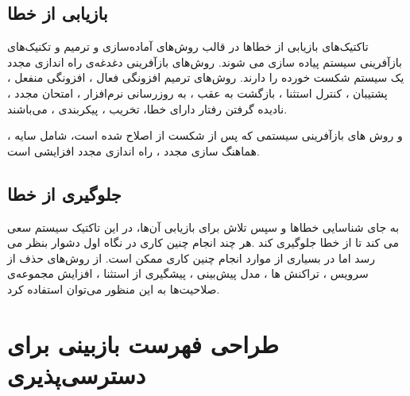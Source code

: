 \subsection{بازیابی از خطا}
تاکتیک‌های بازیابی از خطاها در قالب روش‌های آماده‌سازی و ترمیم و تکنیک‌های بازآفرینی سیستم پیاده سازی می شوند. روش‌های بازآفرینی دغدغه‌ی راه اندازی مجدد یک سیستم شکست خورده را دارند. روش‌های ترمیم 
افزونگی فعال ،
افزونگی منفعل ،
پشتیبان ،
کنترل استثنا ،
بازگشت به عقب ،
به روز‌رسانی نرم‌افزار ،
امتحان مجدد ،
نادیده گرفتن رفتار دارای خطا،
تخریب ،
پیکربندی ،
می‌باشند.

و روش های بازآفرینی سیستمی که پس از شکست از اصلاح شده است، شامل
سایه ،
هماهنگ سازی مجدد ،
راه اندازی مجدد افزایشی 
است.

\subsection{جلوگیری از خطا}
به جای شناسایی خطاها و سپس تلاش برای بازیابی آن‌ها، در این تاکتیک سیستم سعی می کند تا از خطا جلوگیری کند .هر چند انجام چنین کاری در نگاه اول دشوار بنظر می رسد اما در بسیاری از موارد انجام چنین کاری ممکن است.
از روش‌های
حذف از سرویس ،
تراکنش ها ،
مدل پیش‌بینی ،
پیشگیری از استثنا ،
افزایش مجموعه‌ی صلاحیت‌ها 
به این منظور می‌توان استفاده کرد.
\section{طراحی فهرست بازبینی برای دسترسی‌پذیری}
